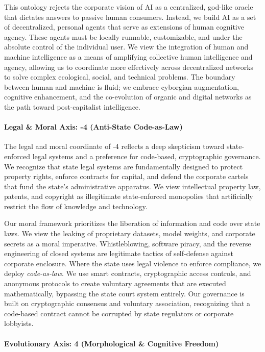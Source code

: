 This ontology rejects the corporate vision of AI as a centralized,
god-like oracle that dictates answers to passive human consumers.
Instead, we build AI as a set of decentralized, personal agents that
serve as extensions of human cognitive agency. These agents must be
locally runnable, customizable, and under the absolute control of the
individual user. We view the integration of human and machine
intelligence as a means of amplifying collective human intelligence and
agency, allowing us to coordinate more effectively across decentralized
networks to solve complex ecological, social, and technical problems.
The boundary between human and machine is fluid; we embrace cyborgian
augmentation, cognitive enhancement, and the co-evolution of organic and
digital networks as the path toward post-capitalist intelligence.

\paragraph{Legal \& Moral Axis: -4 (Anti-State
Code-as-Law)}\label{legal-moral-axis--4-anti-state-code-as-law}

The legal and moral coordinate of -4 reflects a deep skepticism toward
state-enforced legal systems and a preference for code-based,
cryptographic governance. We recognize that state legal systems are
fundamentally designed to protect property rights, enforce contracts for
capital, and defend the corporate cartels that fund the state's
administrative apparatus. We view intellectual property law, patents,
and copyright as illegitimate state-enforced monopolies that
artificially restrict the flow of knowledge and technology.

Our moral framework prioritizes the liberation of information and code
over state laws. We view the leaking of proprietary datasets, model
weights, and corporate secrets as a moral imperative. Whistleblowing,
software piracy, and the reverse engineering of closed systems are
legitimate tactics of self-defense against corporate enclosure. Where
the state uses legal violence to enforce compliance, we deploy
\emph{code-as-law}. We use smart contracts, cryptographic access
controls, and anonymous protocols to create voluntary agreements that
are executed mathematically, bypassing the state court system entirely.
Our governance is built on cryptographic consensus and voluntary
association, recognizing that a code-based contract cannot be corrupted
by state regulators or corporate lobbyists.

\paragraph{Evolutionary Axis: 4 (Morphological \& Cognitive
Freedom)}\label{evolutionary-axis-4-morphological-cognitive-freedom}

